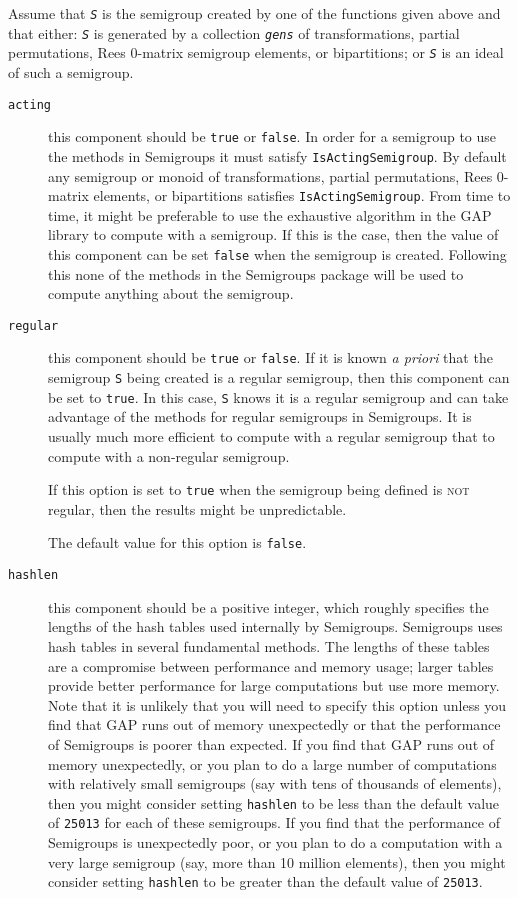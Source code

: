 \documentclass[a4paper,11pt]{report}
\begin{document}
{{ Assume that \mbox{\texttt{\mdseries\slshape S}} is the semigroup created by one of the functions given above and that either: \mbox{\texttt{\mdseries\slshape S}} is generated by a collection \mbox{\texttt{\mdseries\slshape gens}} of transformations, partial permutations, Rees 0-matrix semigroup elements, or
bipartitions; or \mbox{\texttt{\mdseries\slshape S}} is an ideal of such a semigroup. 
\begin{description}
\item[{\texttt{acting}}]  this component should be \texttt{true} or \texttt{false}. In order for a semigroup to use the methods in \textsf{Semigroups} it must satisfy \texttt{IsActingSemigroup}. By default any semigroup or monoid of transformations, partial permutations,
Rees 0-matrix elements, or bipartitions satisfies \texttt{IsActingSemigroup}. From time to time, it might be preferable to use the exhaustive algorithm in
the \textsf{GAP} library to compute with a semigroup. If this is the case, then the value of
this component can be set \texttt{false} when the semigroup is created. Following this none of the methods in the \textsf{Semigroups} package will be used to compute anything about the semigroup. 
\item[{\texttt{regular}}]  this component should be \texttt{true} or \texttt{false}. If it is known \emph{a priori} that the semigroup \texttt{S} being created is a regular semigroup, then this component can be set to \texttt{true}. In this case, \texttt{S} knows it is a regular semigroup and can take advantage of the methods for
regular semigroups in \textsf{Semigroups}. It is usually much more efficient to compute with a regular semigroup that
to compute with a non-regular semigroup.

 If this option is set to \texttt{true} when the semigroup being defined is \textsc{not} regular, then the results might be unpredictable. 

 The default value for this option is \texttt{false}. 
\item[{\texttt{hashlen}}]  this component should be a positive integer, which roughly specifies the
lengths of the hash tables used internally by \textsf{Semigroups}. \textsf{Semigroups} uses hash tables in several fundamental methods. The lengths of these tables
are a compromise between performance and memory usage; larger tables provide
better performance for large computations but use more memory. Note that it is
unlikely that you will need to specify this option unless you find that \textsf{GAP} runs out of memory unexpectedly or that the performance of \textsf{Semigroups} is poorer than expected. If you find that \textsf{GAP} runs out of memory unexpectedly, or you plan to do a large number of
computations with relatively small semigroups (say with tens of thousands of
elements), then you might consider setting \texttt{hashlen} to be less than the default value of \texttt{25013} for each of these semigroups. If you find that the performance of \textsf{Semigroups} is unexpectedly poor, or you plan to do a computation with a very large
semigroup (say, more than 10 million elements), then you might consider
setting \texttt{hashlen} to be greater than the default value of \texttt{25013}. 


\end{description}}}
\end{document}
